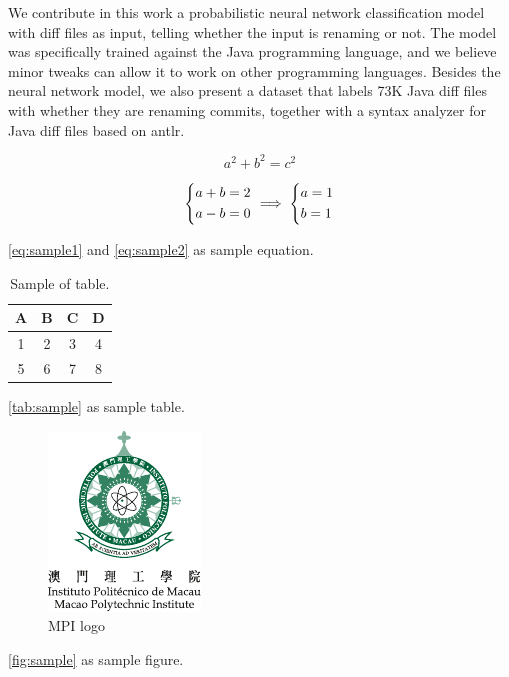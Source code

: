 We contribute in this work a probabilistic neural network classification model with diff files as input, telling whether the input is renaming or not.
The model was specifically trained against the Java programming language, and
we believe minor tweaks can allow it to work on other programming languages.
Besides the neural network model, we also present a dataset that labels 73K Java diff files with whether they are renaming commits,
together with a syntax analyzer for Java diff files based on {\sc antlr}.






\begin{equation}\label{eq:sample1}
	a^2 + b^2 = c^2
\end{equation}

\begin{equation}\label{eq:sample2}
	\begin{dcases}
		a + b = 2\\
		a - b = 0
	\end{dcases}
	\implies
	\begin{dcases}
		a = 1\\
		b = 1
	\end{dcases}
\end{equation}

\autoref{eq:sample1} and \ref{eq:sample2} as sample equation.


\begin{table} [h]
	\centering
	\caption{Sample of table.}
	\begin{tabular}{|c|c|c|c|}
		\hline
		\textbf{A} & \textbf{B} & \textbf{C} & \textbf{D} \\
		\hline
		1 & 2 & 3 & 4 \\
		\hline
		5 & 6 & 7 & 8 \\
		\hline
	\end{tabular}
	\label{tab:sample}
\end{table}

\autoref{tab:sample} as sample table.

\begin{figure} [h]
	\centering
	\includegraphics[width=0.5\linewidth]{MPI.pdf}
	\caption{MPI logo}
	\label{fig:sample}
\end{figure}

\autoref{fig:sample} as sample figure.